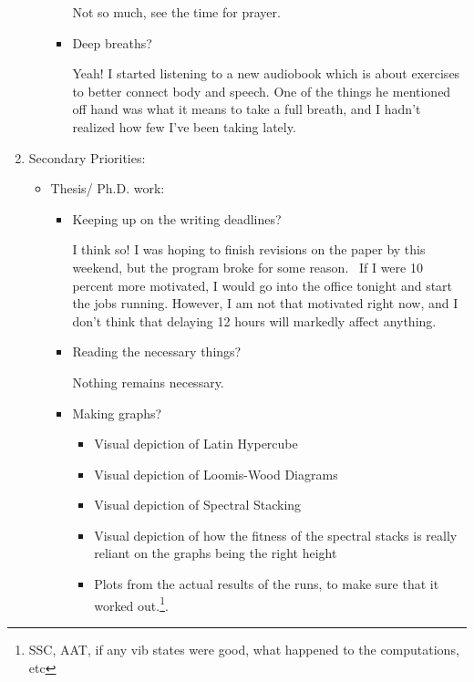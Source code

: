 \documentclass[12pt]{article}
\renewcommand{\,}{\textsuperscript{,}}
\begin{document}
\begin{enumerate}
\begin{itemize}
\begin{itemize}
Not so much, see the time for prayer.

\item Deep breaths?

Yeah! I started listening to a new audiobook which is about exercises to better connect body and speech.  
One of the things he mentioned off hand was what it means to take a full breath, and I hadn't realized how few I've been taking lately.

\end{itemize}

\end{itemize}

\item Secondary Priorities:

\begin{itemize}

\item Thesis/ Ph.D. work:

\begin{itemize}

\item Keeping up on the writing deadlines?

I think so! I was hoping to finish revisions on the paper by this weekend, but the program broke for some reason.   
If I were 10 percent more motivated, I would go into the office tonight and start the jobs running.  
However, I am not that motivated right now, and I don't think that delaying 12 hours will markedly affect anything.

\item Reading the necessary things?

Nothing remains necessary.

\item Making graphs?

\begin{itemize}

\item Visual depiction of Latin Hypercube

\item Visual depiction of Loomis-Wood Diagrams

\item Visual depiction of Spectral Stacking

\item Visual depiction of how the fitness of the spectral stacks is really reliant on the graphs being the right height

\item Plots from the actual results of the runs, to make sure that it worked out.\footnote{SSC, AAT, if any vib states were good, what happened to the computations, etc}.


\end{itemize}
\end{itemize}
\end{itemize}
\end{enumerate}
\end{document}
